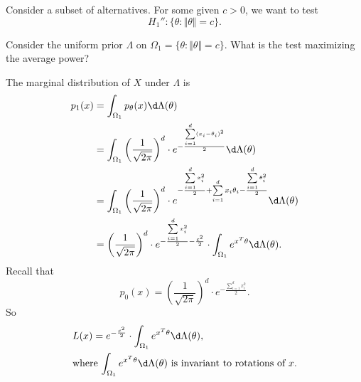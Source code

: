 \documentclass[a4paper]{article}
\begin{document}
\begin{eg}
	Consider a subset of alternatives. For some given $c > 0$, we want to test
	\begin{equation*}
		H_1'': \{\theta: \Vert \theta \Vert = c\}.
	\end{equation*}
	\begin{question}
		Consider the uniform prior $\Lambda$ on $\Omega_1 = \{\theta: \Vert \theta \Vert = c\}$. What is the test maximizing the average power?
	\end{question}
	\begin{answer}
		The marginal distribution of $X$ under $\Lambda$ is
		\begin{equation*}
			\begin{aligned}
				p_1(x) &= \int_{\Omega_1} p_{\theta}(x) \d \Lambda(\theta) \\
				&= \int_{\Omega_1} \left(\frac{1}{\sqrt{2\pi}}\right)^d \cdot e^{-\frac{\sum\limits_{i=1}^d (x_i - \theta_i)^2}{2}} \d \Lambda(\theta) \\
				&= \int_{\Omega_1} \left(\frac{1}{\sqrt{2\pi}}\right)^d \cdot e^{-\frac{\sum\limits_{i=1}^d x_i^2}{2} + \sum\limits_{i=1}^d x_i \theta_i - \frac{\sum\limits_{i=1}^d \theta_i^2}{2}} \d \Lambda(\theta) \\
				&= \left(\frac{1}{\sqrt{2\pi}}\right)^d \cdot e^{-\frac{\sum\limits_{i=1}^d x_i^2}{2} -\frac{c^2}{2}} \cdot \int_{\Omega_1} e^{x^T\theta} \d \Lambda(\theta).
			\end{aligned}
		\end{equation*}
		Recall that
		\begin{equation*}
			p_0(x) = \left(\frac{1}{\sqrt{2\pi}}\right)^d \cdot e^{-\frac{\sum\limits_{i=1}^d x_i^2}{2}}.
		\end{equation*}
		So
		\begin{equation*}
			\begin{aligned}
				&L(x) = e^{-\frac{c^2}{2}} \cdot \int_{\Omega_1}e^{x^T\theta} \d \Lambda(\theta), \\ 
				& \text{where $\int_{\Omega_1}e^{x^T\theta} \d \Lambda(\theta)$ is invariant to rotations of $x$}.
			\end{aligned}
		\end{equation*}
		\begin{center}
\end{center}
\end{answer}
\end{eg}
\end{document}
